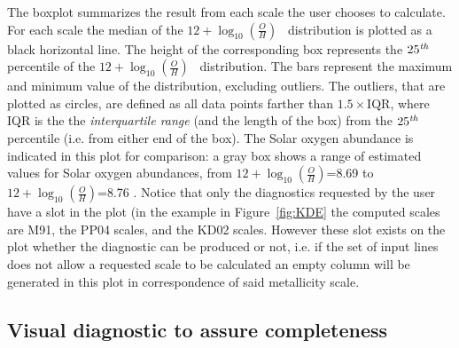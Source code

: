 \documentclass{emulateapj}
\newcommand{\oxab}{\ensuremath{12 + \log_{10}(\frac{O}{H})}}
\begin{document}
The boxplot summarizes the result from each scale the user chooses to calculate. For each scale the median of the \oxab~ distribution is plotted as a black horizontal line. The height of the corresponding box represents the $25^\mathrm{\emph{th}}$ percentile of the \oxab~ distribution. 
The bars represent the maximum and minimum value of the distribution, excluding outliers. The outliers, that are plotted as circles, are defined as all data points farther than  $1.5\times\mathrm{IQR}$, where IQR is the the \emph{interquartile range} (and the length of the box) from the $25^\mathrm{\emph{th}}$ percentile (i.e. from either end of the box). 
The Solar oxygen abundance is indicated in this plot for comparison: a gray box shows a range of estimated values for Solar oxygen abundances, from \oxab=8.69 \citep{asplund09_rev} to \oxab=8.76 \citep{chaffau11}.
Notice that only the diagnostics requested by the user have a slot in the plot (in the example in Figure~\ref{fig:KDE} the computed scales are M91, the PP04 scales, and the KD02 scales. However these slot exists on the plot whether the diagnostic can be produced or not, i.e. if the set of input lines does not allow a requested scale to be calculated an empty column will be generated in this plot in correspondence of said metallicity scale.



\subsection{Visual diagnostic to assure completeness}\label{sec:completeness}
\end{document}
